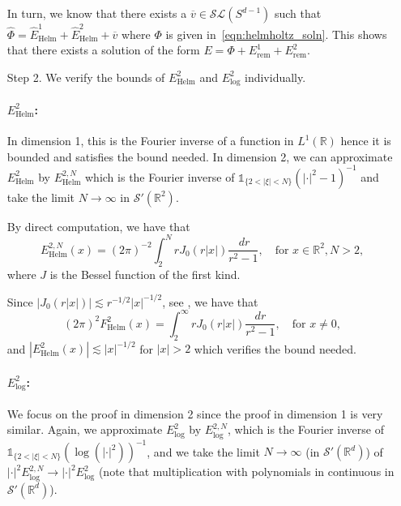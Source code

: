 \documentclass[11pt]{amsart}
\newcommand{\R}{\mathbb{R}}
\begin{document}
\begin{itemize}
In turn, we know that there exists a $\overline{v}\in \mathcal{SL}(S^{d-1})$ such that $\hat{\Phi}=\hat{E}^1_{\text{Helm}}+\hat{E}^2_{\text{Helm}}+\overline{v}$ where $\Phi$ is given in~\eqref{eqn:helmholtz_soln}. This shows that there exists a solution of the form ${E}=\Phi+{E}^1_{\text{rem}}+{E}^2_{\text{rem}}$.
 \item[Step 2.]
 We verify the bounds of $E^{2}_{\text{Helm}}$ and $E^{2}_{\log}$ individually. 
\paragraph{$E^{2}_{\text{Helm}}$:}
In dimension 1, this is the Fourier inverse of a function in $L^1(\R)$ hence it is bounded and satisfies the bound needed. In dimension 2, we can approximate $E^{2}_{\text{Helm}}$ by $E^{2,N}_{\text{Helm}}$ which is the Fourier inverse of $\mathds{1}_{\{2<|\xi|<N\}}(|\cdot |^2-1)^{-1}$ and take the limit $N\rightarrow \infty$ in $\mathcal{S}'(\R^2)$. 

By direct computation, we have that
\begin{equation*}
    {E}_{\text{Helm}}^{2,N}(x)=(2\pi)^{-2}\int_{2}^{N}rJ_0(r|x|)\frac{\,dr}{r^2-1}, \quad \text{for $x\in \R^2, N>2$,}
\end{equation*}
where $J$ is the Bessel function of the first kind. 

Since $|J_{0}(r|x|)|\lesssim r^{-1/2}|x|^{-1/2}$, see \cite[Appendix B.8]{MR3243734}, we have that 
\begin{equation*}
    (2\pi)^{2}F^{2}_{\text{Helm}}(x)=\int_{2}^{\infty}rJ_0(r|x|)\frac{dr}{r^2-1}, \quad \text{for $x\ne 0$,}
\end{equation*}
and $|E^{2}_{\text{Helm}}(x)|\lesssim |x|^{-1/2}$ for $|x|>2$ which verifies the bound needed. 

\paragraph{$E^{2}_{\log}$:}

We focus on the proof in dimension 2 since the proof in dimension 1 is very similar. Again, we approximate $E^{2}_{\log}$ by $E^{2, N}_{\log}$, which is the Fourier inverse of $\mathds{1}_{\{2<|\xi|<N\}}(\log(|\cdot|^2))^{-1}$, and we take the limit $N\rightarrow \infty$ (in $\mathcal{S}'(\R^d)$) of $|\cdot|^2E^{2,N}_{\log}\rightarrow |\cdot|^2E^{2}_{\log}$ (note that multiplication with polynomials in continuous in $\mathcal{S}'(\R^d)$). 


\end{itemize}
\end{document}
